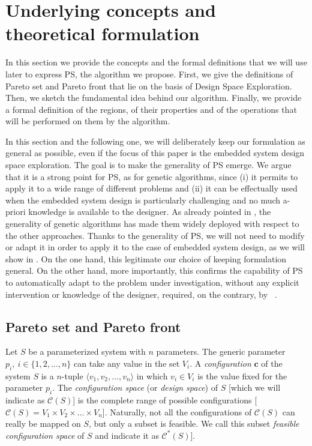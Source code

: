 
\section{Underlying concepts and theoretical formulation}

In this section we provide the concepts and the formal
definitions that we will use later to express PS, the algorithm we
propose.  First, we give the definitions of Pareto set and Pareto
front that lie on the basis of Design Space Exploration.
Then, we sketch the fundamental idea behind our algorithm. Finally, we
provide a formal definition of the regions, of their properties and of
the operations that will be performed on them by the algorithm.

In this section and the following one, we will deliberately keep our formulation as general as possible, even if the focus of this paper is the embedded system design space exploration. The goal is to make the generality of PS emerge. We argue that it is a strong point for PS, as for genetic algorithms, since (i) it permits to apply it to a wide range of different problems and (ii) it can be effectually used when the embedded system design is particularly challenging and no much a-priori knowledge is available to the designer. As already pointed in , the generality of genetic algorithms has made them widely deployed with respect to the other approaches.
Thanks to the generality of PS, we will not need to modify or adapt it in order to apply it to the case of embedded system design, as we will show in . On the one hand, this legitimate our choice of keeping formulation general. On the other hand, more importantly, this confirms the capability of PS to automatically adapt to the problem under investigation, without any explicit intervention or knowledge of the designer, required, on the contrary, by~\cite{givargis_tvlsi02,santosh_hptr00,dellnitz2005covering} .

\subsection{Pareto set and Pareto front}

Let $S$ be a parameterized system with $n$ parameters. The generic
parameter $p_i, \ i \in \{1,2,\ldots,n\}$ can take any value in
the set $V_i$. A {\em configuration} $\mathbf{c}$ of the system
$S$ is a $n$-tuple $\langle v_1,v_2,\ldots,v_n \rangle$ in which
$v_i \in V_i$ is the value fixed for the parameter $p_i$. The {\em
configuration space} (or {\em design space}) of $S$ [which we will
indicate as $\mathcal{C}(S)$] is the complete range of possible
configurations [$\mathcal{C}(S) = V_1 \times V_2 \times \ldots
\times V_n$]. Naturally, not all the configurations of
$\mathcal{C}(S)$ can really be mapped on $S$, but only a subset 
is feasible. We call this subset {\em
feasible configuration space} of $S$ and indicate it as
$\mathcal{C}^*(S)$].

